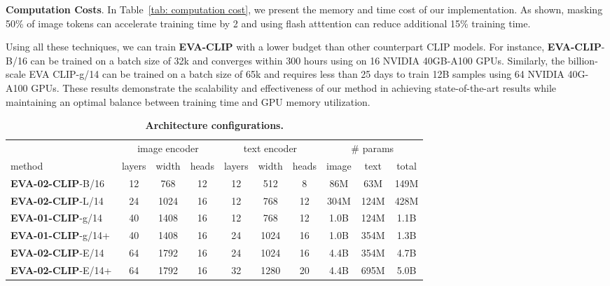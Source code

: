 \documentclass[10pt,twocolumn,letterpaper]{article}
\newcommand{\tablestyle}[2]{\setlength{\tabcolsep}{#1}\renewcommand{\arraystretch}{#2}\centering\footnotesize}
\newcommand{\evablue}[1]{\textcolor{00blue!80}{#1}}
\newcommand{\ph}[1]{\textcolor{white}{#1}}
\renewcommand{\paragraph}[1]{\vspace{1.25mm}\noindent\textbf{#1}}
\newcommand{\tblref}[1]{Table~\ref{#1}}
\newcommand{\evaclip}{{\textbf{\evablue{EVA-CLIP}}}\xspace}
\newcommand{\evaOneclip}{{\textbf{\evablue{EVA-01-CLIP}}}\xspace}
\newcommand{\evaTwoclip}{{\textbf{\evablue{EVA-02-CLIP}}}\xspace}
\begin{document}
\paragraph{Computation Costs}. In \tblref{tab: computation cost}, we present the memory and time cost of our implementation. As shown, masking 50\% of image tokens can accelerate training time by 2 and using flash atttention can reduce additional 15\% training time.

Using all these techniques, we can train \evaclip with a lower budget than other counterpart CLIP models. For instance, \evaclip-B/16 can be trained on a batch size of 32k and converges within 300 hours using  on 16 NVIDIA 40GB-A100 GPUs. Similarly, the billion-scale EVA CLIP-g/14 can be trained on a batch size of 65k and requires less than 25 days to train 12B samples using 64 NVIDIA 40G-A100 GPUs. These results demonstrate the scalability and effectiveness of our method in achieving state-of-the-art results while maintaining an optimal balance between training time and GPU memory utilization.






\begin{table}[t!]
    \tablestyle{0.8pt}{1.2}
    \scriptsize
    \begin{tabular}{l|ccc|ccc|ccc}
        & \multicolumn{3}{c|}{image encoder} & \multicolumn{3}{c|}{text encoder} & \multicolumn{3}{c}{\# \scriptsize{params}} \\
        method & layers & width & heads & layers & width & heads & image & text & total \\ 
        \shline
        \evaTwoclip-B/16\ph{+} & 12 &  768 & 12 & 12 &  512 &  8 &  86M &  63M & 149M \\
        \evaTwoclip-L/14\ph{+} & 24 & 1024 & 16 & 12 &  768 & 12 & 304M & 124M & 428M \\
        \evaOneclip-g/14\ph{+} & 40 & 1408 & 16 & 12 & 768 & 12 & 1.0B & 124M & 1.1B \\
        \evaOneclip-g/14+ & 40 & 1408 & 16 & 24 & 1024 & 16 & 1.0B & 354M & 1.3B \\
        \evaTwoclip-E/14\ph{+} & 64 & 1792 & 16 & 24 & 1024 & 16 & 4.4B & 354M & 4.7B \\
        \evaTwoclip-E/14+ & 64 & 1792 & 16 & 32 & 1280 & 20 & 4.4B & 695M & 5.0B \\
    \end{tabular}
    \vspace{-.5em}
    \caption{\textbf{Architecture configurations.}
    }
    \label{evacliparch}
\end{table}
\end{document}
